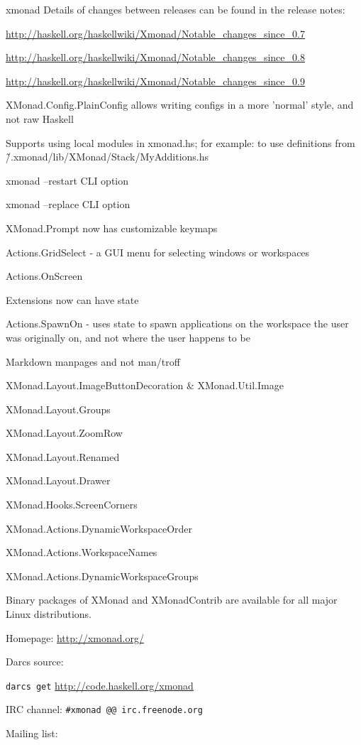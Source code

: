 \begin{hcarentry}{xmonad}
Details of changes between releases can be found in the release notes:
\begin{compactitem}
\item \url{http://haskell.org/haskellwiki/Xmonad/Notable_changes_since_0.7}
\item \url{http://haskell.org/haskellwiki/Xmonad/Notable_changes_since_0.8}
\item \url{http://haskell.org/haskellwiki/Xmonad/Notable_changes_since_0.9}
\item XMonad.Config.PlainConfig allows writing configs in a more 'normal' style, and not raw Haskell
\item Supports using local modules in xmonad.hs; for example: to use definitions from \~/.xmonad/lib/XMonad/Stack/MyAdditions.hs
\item xmonad --restart CLI option
\item xmonad --replace CLI option
\item XMonad.Prompt now has customizable keymaps
\item Actions.GridSelect - a GUI menu for selecting windows or workspaces
\item Actions.OnScreen
\item Extensions now can have state
\item Actions.SpawnOn - uses state to spawn applications on the workspace the user was originally on,
  and not where the user happens to be
\item Markdown manpages and not man/troff
\item  XMonad.Layout.ImageButtonDecoration \& XMonad.Util.Image
\item XMonad.Layout.Groups
\item XMonad.Layout.ZoomRow
\item XMonad.Layout.Renamed
\item XMonad.Layout.Drawer
\item XMonad.Hooks.ScreenCorners
\item XMonad.Actions.DynamicWorkspaceOrder
\item XMonad.Actions.WorkspaceNames
\item XMonad.Actions.DynamicWorkspaceGroups
\end{compactitem}

Binary packages of XMonad and XMonadContrib are available for all major Linux distributions.

\FurtherReading
\begin{compactitem}
\item Homepage:
 \url{http://xmonad.org/}

\item Darcs source:

 \texttt{darcs get} \url{http://code.haskell.org/xmonad}

\item IRC channel:
 \verb+#xmonad @@ irc.freenode.org+

\item Mailing list:
\end{compactitem}
\end{hcarentry}
